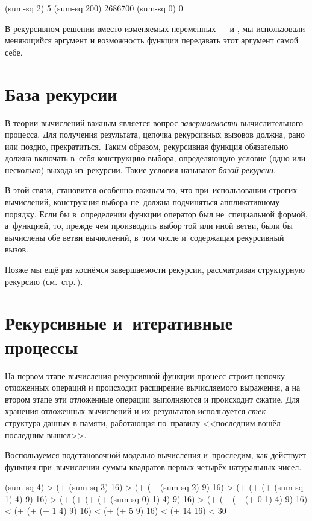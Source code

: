 \REPL
  {(sum-sq 2)}
  {5}
\REPL
  {(sum-sq 200)}
  {2686700}
\REPL
  {(sum-sq 0)}
  {0}

В рекурсивном решении вместо изменяемых переменных ---  и , мы использовали меняющийся аргумент  и возможность функции передавать этот аргумент самой себе.



\section[2]{База рекурсии}%
В теории вычислений важным является вопрос \emph{завершаемости} вычислительного процесса. Для получения результата, цепочка рекурсивных вызовов должна, рано или поздно, прекратиться. Таким образом, рекурсивная функция обязательно должна включать в~себя конструкцию выбора, определяющую условие (одно или несколько) выхода из~рекурсии. Такие условия называют \emph{базой рекурсии}.

В этой связи, становится особенно важным то, что при~использовании строгих вычислений, конструкция выбора не~должна подчиняться аппликативному порядку. Если бы в~определении функции  оператор  был не~специальной формой, а~функцией, то, прежде чем производить выбор той или иной ветви, были бы вычислены обе ветви вычислений, в~том числе и~содержащая рекурсивный вызов.

Позже мы ещё раз коснёмся завершаемости рекурсии, рассматривая структурную рекурсию (см.~стр.\,\pageref{struct-recursion}).

\section[4]{Рекурсивные и~итеративные процессы}\label{iterations}%
На первом этапе вычисления рекурсивной функции процесс строит цепочку отложенных операций и происходит расширение вычисляемого выражения, а на втором этапе эти отложенные операции выполняются и происходит сжатие. Для хранения отложенных вычислений и их результатов используется \emph{стек}~--- структура данных в памяти, работающая по~правилу <<последним вошёл~--- последним вышел>>.

Воспользуемся подстановочной моделью вычисления и~проследим, как действует функция  при~вычислении суммы квадратов первых четырёх натуральных чисел.
\begin{SchemeCode}
  (sum-sq 4)                          > 
  (+ (sum-sq 3) 16)                   > %
  (+ (+ (sum-sq 2) 9) 16)             > %
  (+ (+ (+ (sum-sq 1) 4) 9) 16)       > 
  (+ (+ (+ (+ (sum-sq 0) 1) 4) 9) 16) > %
  (+ (+ (+ (+ 0 1) 4) 9) 16)          < 
  (+ (+ (+ 1 4) 9) 16)                < %
  (+ (+ 5 9) 16)                      < %
  (+ 14 16)                           <
  30
\end{SchemeCode}

